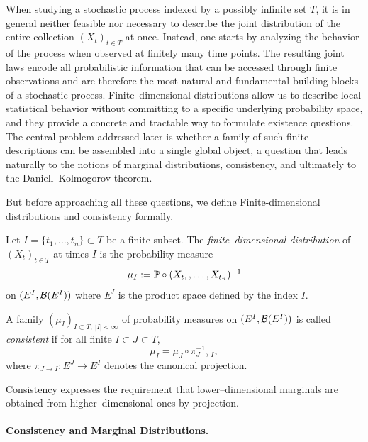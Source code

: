 When studying a stochastic process indexed by a possibly infinite set $T$, it is in
general neither feasible nor necessary to describe the joint distribution of the entire
collection $(X_t)_{t\in T}$ at once. Instead, one starts by analyzing the behavior of the
process when observed at finitely many time points. The resulting joint laws encode all
probabilistic information that can be accessed through finite observations and are therefore
the most natural and fundamental building blocks of a stochastic process. Finite--dimensional
distributions allow us to describe local statistical behavior without committing to a
specific underlying probability space, and they provide a concrete and tractable way to
formulate existence questions. The central problem addressed later is whether a family of
such finite descriptions can be assembled into a single global object, a question that
leads naturally to the notions of marginal distributions, consistency, and ultimately to
the Daniell--Kolmogorov theorem.

But before approaching all these questions, we define Finite-dimensional distributions and consistency formally.

\begin{definition}
Let $I = \{t_1,\dots,t_n\} \subset T$ be a finite subset.
The \emph{finite--dimensional distribution} of $(X_t)_{t\in T}$ at times $I$
is the probability measure
\[
\mu_I := \mathbb{P} \circ (X_{t_1},\dots,X_{t_n})^{-1}
\]
on $(E^I,\mathcal{B}(E^I))$ where $E^I$ is the product space defined by the index $I$.
\end{definition}

\begin{definition}[Consistency]
A family $(\mu_I)_{I\subset T,\ |I|<\infty}$ of probability measures on
$(E^I,\mathcal{B}(E^I))$ is called \emph{consistent} if for all finite $I \subset J \subset T$,
\[
\mu_I = \mu_J \circ \pi_{J\to I}^{-1},
\]
where $\pi_{J\to I} : E^J \to E^I$ denotes the canonical projection.
\end{definition}

\begin{remark}
Consistency expresses the requirement that lower--dimensional marginals are obtained
from higher--dimensional ones by projection.
\end{remark}

\paragraph{Consistency and Marginal Distributions.}

